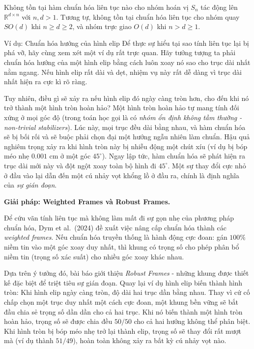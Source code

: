 \begin{theorem}
\label{thm:no-continuous-canon}
Không tồn tại hàm chuẩn hóa liên tục nào cho nhóm hoán vị $S_n$ tác động lên $\mathbb{R}^{d \times n}$ với $n, d > 1$. Tương tự, không tồn tại chuẩn hóa liên tục cho nhóm quay $SO(d)$ khi $n \geq d \geq 2$, và nhóm trực giao $O(d)$ khi $n > d \geq 1$.
\end{theorem}

\begin{examplebox}{Ví dụ: Chuẩn hóa hướng của hình elip}
Để thực sự hiểu tại sao tính liên tục lại bị phá vỡ, hãy cùng xem xét một ví dụ rất trực quan. Hãy tưởng tượng ta phải chuẩn hóa hướng của một hình elip bằng cách luôn xoay nó sao cho trục dài nhất nằm ngang. Nếu hình elip rất dài và dẹt, nhiệm vụ này rất dễ dàng vì trục dài nhất hiện ra cực kì rõ ràng. 

Tuy nhiên, điều gì sẽ xảy ra nếu hình elip đó ngày càng tròn hơn, cho đến khi nó trở thành một hình tròn hoàn hảo? Một hình tròn hoàn hảo tự mang tính đối xứng ở mọi góc độ (trong toán học gọi là có \textit{nhóm ổn định không tầm thường - non-trivial stabilizers}). Lúc này, mọi trục đều dài bằng nhau, và hàm chuẩn hóa sẽ bị bối rối và sẽ buộc phải chọn đại một hướng ngẫu nhiên làm chuẩn. 
Hậu quả nghiêm trọng xảy ra khi hình tròn này bị nhiễu động một chút xíu (ví dụ bị bóp méo nhẹ $0.001$ cm ở một góc $45^\circ$). Ngay lập tức, hàm chuẩn hóa sẽ phát hiện ra trục dài mới này và đột ngột xoay toàn bộ hình đi $45^\circ$. Một sự thay đổi cực nhỏ ở đầu vào lại dẫn đến một cú nhảy vọt khổng lồ ở đầu ra, chính là định nghĩa của \textit{sự gián đoạn}.
\end{examplebox}

\textbf{Giải pháp: Weighted Frames và Robust Frames.}

Để cứu vãn tính liên tục mà không làm mất đi sự gọn nhẹ của phương pháp chuẩn hóa, Dym et al.\ (2024) đề xuất việc nâng cấp chuẩn hóa thành các \textit{weighted frames}. Nếu chuẩn hóa truyền thống là hành động cực đoan: gán $100\%$ niềm tin vào một góc xoay duy nhất, thì khung có trọng số cho phép phân bổ niềm tin (trọng số xác suất) cho nhiều góc xoay khác nhau. 

Dựa trên ý tưởng đó, bài báo giới thiệu \textit{Robust Frames} - những khung được thiết kế đặc biệt để triệt tiêu sự gián đoạn. Quay lại ví dụ hình elip biến thành hình tròn: Khi hình elip ngày càng tròn, độ dài hai trục dần bằng nhau. Thay vì cứ cố chấp chọn một trục duy nhất một cách cực đoan, một khung bền vững sẽ bắt đầu chia sẻ trọng số dần dần cho cả hai trục. Khi nó biến thành một hình tròn hoàn hảo, trọng số sẽ được chia đều $50/50$ cho cả hai hướng không thể phân biệt. Khi hình tròn bị bóp méo nhẹ trở lại thành elip, trọng số sẽ thay đổi rất mượt mà (ví dụ thành $51/49$), hoàn toàn không xảy ra bất kỳ cú nhảy vọt nào.

